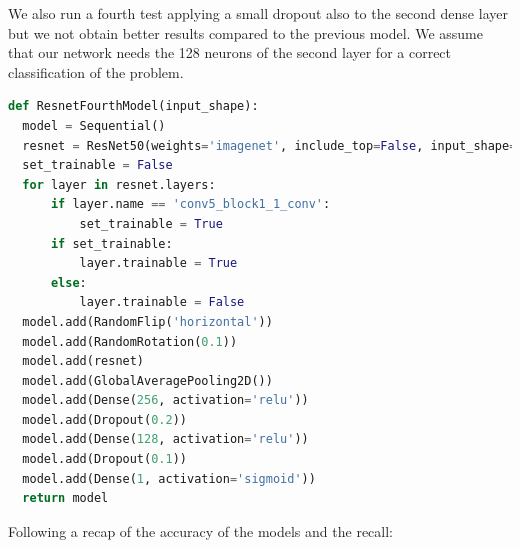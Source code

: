 We also run a fourth test applying a small dropout also to the second dense layer but we not obtain better results compared to the previous model. We assume that our network needs the 128 neurons of the second layer for a correct classification of the problem.
\begin{lstlisting}[language=python, caption={ResNet50, fourth model code}, label={lst:resnet50CodeFourthTest}]
def ResnetFourthModel(input_shape):
  model = Sequential()
  resnet = ResNet50(weights='imagenet', include_top=False, input_shape=input_shape)
  set_trainable = False
  for layer in resnet.layers:
      if layer.name == 'conv5_block1_1_conv':
          set_trainable = True
      if set_trainable:
          layer.trainable = True
      else:
          layer.trainable = False
  model.add(RandomFlip('horizontal'))
  model.add(RandomRotation(0.1))
  model.add(resnet)
  model.add(GlobalAveragePooling2D())
  model.add(Dense(256, activation='relu'))
  model.add(Dropout(0.2))
  model.add(Dense(128, activation='relu'))
  model.add(Dropout(0.1))
  model.add(Dense(1, activation='sigmoid'))
  return model
\end{lstlisting}

Following a recap of the accuracy of the models and the recall:

\begin{table}[!h]
    \centering
    \caption{ResNet50 accuracy and recall}
    \label{tab:ResNet50}
    \end{table}

